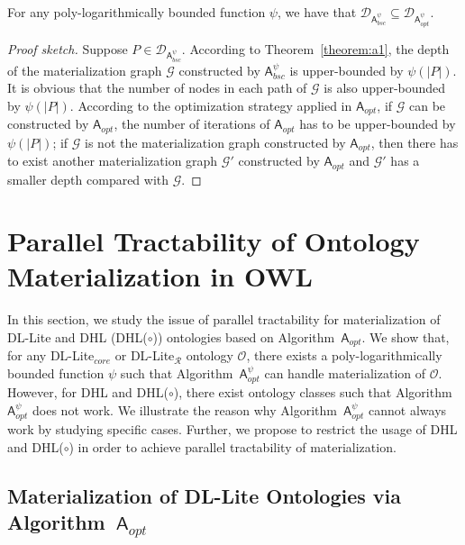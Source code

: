 \documentclass[final,1p,times]{elsarticle}
\begin{document}
\begin{corollary}
For any poly-logarithmically bounded function $\psi$,
we have that $\mathcal{D}_{\mathsf{A}_{bsc}^{\psi}}\subseteq\mathcal{D}_{\mathsf{A}_{opt}^{\psi}}$.
\end{corollary}

\begin{proof}[Proof sketch]
Suppose $P\in\mathcal{D}_{\mathsf{A}_{bsc}^{\psi}}$. According to Theorem~\ref{theorem:a1},
the depth of the materialization graph $\mathcal{G}$ constructed by $\mathsf{A}_{bsc}^{\psi}$ is upper-bounded by $\psi(|P|)$.
It is obvious that the number of nodes in each path of $\mathcal{G}$ is also upper-bounded by $\psi(|P|)$.
According to the optimization strategy applied in $\mathsf{A}_{opt}$, if $\mathcal{G}$ can be constructed
by $\mathsf{A}_{opt}$, the number of iterations of $\mathsf{A}_{opt}$ has to be upper-bounded by $\psi(|P|)$;
if $\mathcal{G}$ is not the materialization graph constructed
by $\mathsf{A}_{opt}$, then there has to exist another materialization graph $\mathcal{G}'$ constructed by $\mathsf{A}_{opt}$
and $\mathcal{G}'$ has a smaller depth compared with $\mathcal{G}$.
\end{proof}


\section{Parallel Tractability of Ontology Materialization in OWL}
\label{sec:ptonto}

In this section, we study the issue of parallel tractability
for materialization of DL-Lite and DHL (DHL($\circ$)) ontologies
based on Algorithm~$\mathsf{A}_{opt}$.
We show that, for any DL-Lite$_{core}$ or DL-Lite$_\mathcal{R}$ ontology $\mathcal{O}$,
there exists a poly-logarithmically bounded function $\psi$
such that Algorithm~$\mathsf{A}_{opt}^{\psi}$ can handle materialization of $\mathcal{O}$.
However, for DHL and DHL($\circ$), there exist ontology classes such that Algorithm~$\mathsf{A}_{opt}^\psi$
does not work. We illustrate the reason why Algorithm~$\mathsf{A}_{opt}^\psi$ cannot always
work by studying specific cases.
Further, we propose to restrict the usage of DHL and DHL($\circ$) in order to achieve parallel tractability
of materialization.

\subsection{Materialization of DL-Lite Ontologies via Algorithm~$\mathsf{A}_{opt}$}
\end{document}

